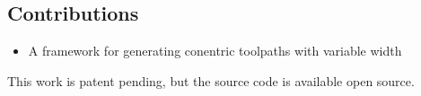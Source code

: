 \subsection{Contributions}
\begin{itemize}
\item A framework for generating conentric toolpaths with variable width
\end{itemize}

This work is patent pending, but the source code is available open source.

